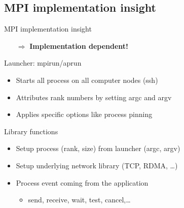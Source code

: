\documentclass[aspectratio=43]{beamer}
\begin{document}
\subsection{MPI implementation insight}
\begin{frame}{MPI implementation insight}
\begin{itemize}
    \item[\color{cscsred}$\Rightarrow$]\textbf{\color{cscsred}Implementation dependent!}
\end{itemize}

\begin{blue1block}{Launcher: mpirun/aprun}
\begin{itemize}
    \item Starts all process on all computer nodes (ssh)
    \item Attributes rank numbers by setting argc and argv
    \item Applies specific options like process pinning
\end{itemize}
\end{blue1block}

\begin{blue1block}{Library functions}
\begin{itemize}
    \item Setup process (rank, size) from launcher (argc, argv)
    \item Setup underlying network library (TCP, RDMA, \ldots)
    \item Process event coming from the application
        \begin{itemize}
        \item send, receive, wait, test, cancel,\ldots
        \end{itemize}
\end{itemize}
\end{blue1block}

\end{frame}
\end{document}
